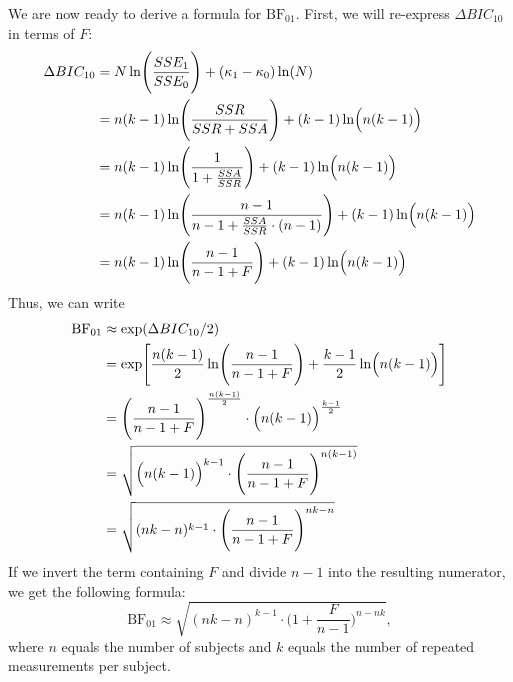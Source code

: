 \documentclass[12pt,twoside,a4paper]{article}
\begin{document}
We are now ready to derive a formula for $\text{BF}_{01}$. First, we will re-express $\Delta BIC_{10}$ in terms of $F$:%
\begin{align*}
  \Delta BIC_{10} &= N\ln \Biggl(\frac{SSE_1}{SSE_0}\Biggr) + (\kappa_1-\kappa_0)\ln(N)\\
                  &= n(k-1)\ln\Biggl(\frac{SSR}{SSR+SSA}\Biggr) + (k-1)\ln\Bigl(n(k-1)\Bigr)\\
                  &= n(k-1)\ln\Biggl(\frac{1}{1+\frac{SSA}{SSR}}\Biggr) + (k-1)\ln\Bigl(n(k-1)\Bigr)\\
                  &= n(k-1)\ln\Biggl(\frac{n-1}{n-1+\frac{SSA}{SSR}\cdot (n-1)}\Biggr) + (k-1)\ln\Bigl(n(k-1)\Bigr)\\
  &= n(k-1)\ln\Biggl(\frac{n-1}{n-1+F}\Biggr) + (k-1)\ln\Bigl(n(k-1)\Bigr)\\
\end{align*}%
Thus, we can write%
\begin{align*}
  \text{BF}_{01} &\approx \exp(\Delta BIC_{10}/2)\\
          &= \exp \Biggl[ \frac{n(k-1)}{2}\ln \Biggl(\frac{n-1}{n-1+F}\Biggr) + \frac{k-1}{2}\ln\Bigl(n(k-1)\Bigr)\Biggr]\\
          &= \Biggl(\frac{n-1}{n-1+F}\Biggr)^{\frac{n(k-1)}{2}}\cdot \Bigl(n(k-1)\Bigr)^{\frac{k-1}{2}}\\
          &= \sqrt{\Bigl(n(k-1)\Bigr)^{k-1}\cdot \Biggl(\frac{n-1}{n-1+F}\Biggr)^{n(k-1)}}\\
          &= \sqrt{(nk-n)^{k-1}\cdot \Biggl(\frac{n-1}{n-1+F}\Biggr)^{nk-n}}
\end{align*}%
If we invert the term containing $F$ and divide $n-1$ into the resulting numerator, we get the following formula:%
\begin{equation}\label{eq:bic2}
          \text{BF}_{01} \approx \sqrt{(nk-n)^{k-1}\cdot \Biggl(1+\frac{F}{n-1}\Biggr)^{n-nk}},
\end{equation}%
where $n$ equals the number of subjects and $k$ equals the number of repeated measurements per subject.
\end{document}
